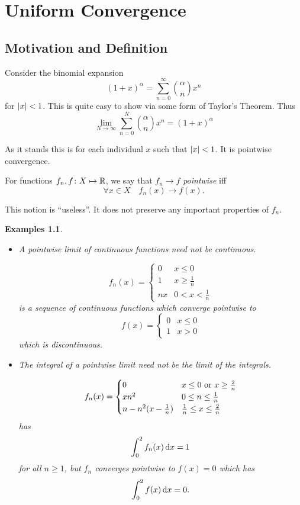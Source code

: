 \documentclass{notes}
\theoremstyle{plain}
\newtheorem*{examples}{Examples}
\newcommand{\Forall}[1]{\forall #1 \quad}
\begin{document}

\chapter{Uniform Convergence}
\section{Motivation and Definition}
Consider the binomial expansion
\[ (1+x)^{\alpha} = \sum_{n=0}^{\infty} \binom{ \alpha}{ n } x^{n} \] 
for $ \left|x\right|<1 $.
This is quite easy to show via some form of Taylor's Theorem.
Thus
\[ \lim_{N \to \infty} \sum_{n=0}^{N}\binom{ \alpha}{ n }x^{n}
= (1+x)^{\alpha} \]

As it stands this is for each individual $x$ such that $\left|x\right|<1 $.  It 
is pointwise convergence.

For functions $ f_{n}, f \colon X \mapsto \mathbb{R} $, we say that $ f_{n} 
\to f $ \emph{pointwise} iff
\[ \Forall{x \in X} f_{n}(x) \to f(x). \]

This notion is ``useless''.  It does not preserve any important
properties of $f_n$.

\begin{examples}
\

\begin{itemize}
\item A pointwise limit of continuous functions need not be continuous.

\[ f_{n}(x) =
\begin{cases}
0& x \leq 0 \\
1& x \geq \frac{1}{n} \\
nx& 0<x<\frac{1}{n}
\end{cases} \]
is a sequence of continuous functions which converge pointwise to
\[ f(x) =
\begin{cases}
0& x \leq 0 \\
1& x > 0
\end{cases} \]
which is discontinuous.

\item The integral of a pointwise limit need not be the limit of the 
integrals.

\[ f_{n}(x) =
\begin{cases}
0& \text{$ x \leq 0 $ or $ x \geq \frac{2}{n} $} \\
xn^{2}& 0 \leq n \leq \frac{1}{n} \\
n-n^{2}(x-\frac{1}{n})& \frac{1}{n} \leq x \leq \frac{2}{n}
\end{cases} \]
has
\[ \int_{0}^{2}f_{n}(x)\,\mathrm{d} x = 1 \]
for all $ n \geq 1 $, but $ f_{n} $ converges pointwise to $ 
f(x)=0 $ which has
\[ \int_{0}^{2}f(x)\,\mathrm{d} x = 0. \]
\end{itemize}
\end{examples}
\end{document}
